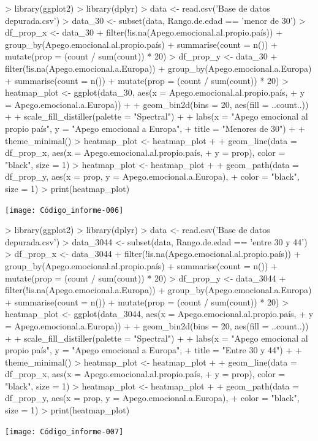 \documentclass{article}
\begin{document}
\newpage
\begin{Schunk}
\begin{Sinput}
> library(ggplot2)
> library(dplyr)
> data <- read.csv('Base de datos depurada.csv')
> data_30 <- subset(data, Rango.de.edad == 'menor de 30')
> df_prop_x <- data_30 %
+   filter(!is.na(Apego.emocional.al.propio.país)) %
+   group_by(Apego.emocional.al.propio.país) %
+   summarise(count = n()) %
+   mutate(prop = (count / sum(count)) * 20)
> df_prop_y <- data_30 %
+   filter(!is.na(Apego.emocional.a.Europa)) %
+   group_by(Apego.emocional.a.Europa) %
+   summarise(count = n()) %
+   mutate(prop = (count / sum(count)) * 20)
> heatmap_plot <- ggplot(data_30, aes(x = Apego.emocional.al.propio.país,
+                                  y = Apego.emocional.a.Europa)) +
+   geom_bin2d(bins = 20, aes(fill = ..count..)) +
+   scale_fill_distiller(palette = "Spectral") +
+   labs(x = "Apego emocional al propio país", y = "Apego emocional a Europa",
+        title = "Menores de 30") +
+   theme_minimal()
> heatmap_plot <- heatmap_plot +
+   geom_line(data = df_prop_x, aes(x = Apego.emocional.al.propio.país,
+                                   y = prop), color = "black", size = 1)
> heatmap_plot <- heatmap_plot +
+   geom_path(data = df_prop_y, aes(x = prop, y = Apego.emocional.a.Europa),
+             color = "black", size = 1)
> print(heatmap_plot)
\end{Sinput}
\end{Schunk}
\texttt{[image: Código\_informe-006]}

\newpage
\begin{Schunk}
\begin{Sinput}
> library(ggplot2)
> library(dplyr)
> data <- read.csv('Base de datos depurada.csv')
> data_3044 <- subset(data, Rango.de.edad == 'entre 30 y 44')
> df_prop_x <- data_3044 %
+   filter(!is.na(Apego.emocional.al.propio.país)) %
+   group_by(Apego.emocional.al.propio.país) %
+   summarise(count = n()) %
+   mutate(prop = (count / sum(count)) * 20)
> df_prop_y <- data_3044 %
+   filter(!is.na(Apego.emocional.a.Europa)) %
+   group_by(Apego.emocional.a.Europa) %
+   summarise(count = n()) %
+   mutate(prop = (count / sum(count)) * 20)
> heatmap_plot <- ggplot(data_3044, aes(x = Apego.emocional.al.propio.país,
+                                  y = Apego.emocional.a.Europa)) +
+   geom_bin2d(bins = 20, aes(fill = ..count..)) +
+   scale_fill_distiller(palette = "Spectral") +
+   labs(x = "Apego emocional al propio país", y = "Apego emocional a Europa",
+        title = "Entre 30 y 44") +
+   theme_minimal()
> heatmap_plot <- heatmap_plot +
+   geom_line(data = df_prop_x, aes(x = Apego.emocional.al.propio.país,
+                                   y = prop), color = "black", size = 1)
> heatmap_plot <- heatmap_plot +
+   geom_path(data = df_prop_y, aes(x = prop, y = Apego.emocional.a.Europa),
+             color = "black", size = 1)
> print(heatmap_plot)
\end{Sinput}
\end{Schunk}
\texttt{[image: Código\_informe-007]}
\end{document}
